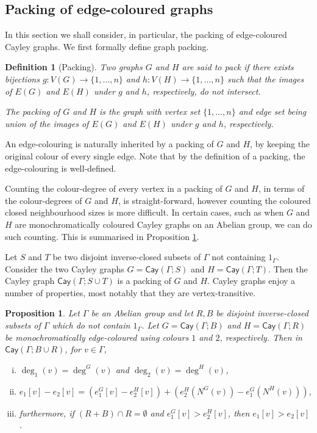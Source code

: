 \documentclass[a4paper,12pt]{article}
\newtheorem{definition}{Definition}[section]
\newtheorem{proposition}[theorem]{Proposition}
\newcommand{\cay}[2]{\mathsf{Cay}\left(#1 ; #2\right)}
\begin{document}
\subsection{Packing of edge-coloured graphs}

In this section we shall consider, in particular, the packing of edge-coloured Cayley graphs. We first formally define graph packing.

\begin{definition}[Packing]
	Two graphs $G$ and $H$ are said to pack if there exists bijections $g \colon V(G) \rightarrow \{1, \dots, n\}$ and $h \colon V(H) \rightarrow \{1, \dots, n\}$ such that the images of $E(G)$ and $E(H)$ under $g$ and $h$, respectively, do not intersect. 
	
	The packing of $G$ and $H$ is the graph with vertex set $\{1, \dots, n\}$ and edge set being union of the images of $E(G)$ and $E(H)$ under $g$ and $h$, respectively.
\end{definition}

An edge-colouring is naturally inherited by a packing of $G$ and $H$, by keeping the original colour of every single edge. Note that by the definition of a packing, the edge-colouring is well-defined.

Counting the colour-degree of every vertex in a packing of $G$ and $H$, in terms of the colour-degrees of $G$ and $H$, is straight-forward, however counting the coloured closed neighbourhood sizes is more difficult. In certain cases, such as when $G$ and $H$ are monochromatically coloured Cayley graphs on an Abelian group, we can do such counting. This is summarised in Proposition \ref{cayley_union_counting}. 

Let $S$ and $T$ be two disjoint inverse-closed subsets of $\Gamma$ not containing $1_\Gamma$. Consider the two Cayley graphs $G = \cay{\Gamma}{S}$ and $H = \cay{\Gamma}{T}$. Then the Cayley graph $\cay{\Gamma}{S \cup T}$ is a packing of $G$ and $H$. Cayley graphs enjoy a number of properties, most notably that they are vertex-transitive.

\begin{proposition}\label{cayley_union_counting}
	Let $\Gamma$ be an Abelian group and let $R, B$ be disjoint inverse-closed subsets of $\Gamma$ which do not contain $1_\Gamma$. Let $G = \cay{\Gamma}{B}$ and $H = \cay{\Gamma}{R}$ be monochromatically edge-coloured using colours $1$ and $2$, respectively. Then in $\cay{\Gamma}{B \cup R}$, for $v \in \Gamma$,
	\begin{enumerate}[i.]
		\item $\deg_1 (v) = \deg^G (v)$ and  $\deg_2 (v) = \deg^H (v)$,
		\item $e_1 [v] - e_2 [v] = \left(e_1^G [v] - e_2^H [v]\right) + \left(e_2^H \left(N^G (v)\right) - e_1^G \left(N^H (v)\right)\right)$, 
		\item furthermore, if $(R + B) \cap R = \emptyset$ and $e_1^G [v] > e_2^H [v]$, then $e_1 [v] > e_2 [v]$.
	\end{enumerate}
\end{proposition}
\end{document}
